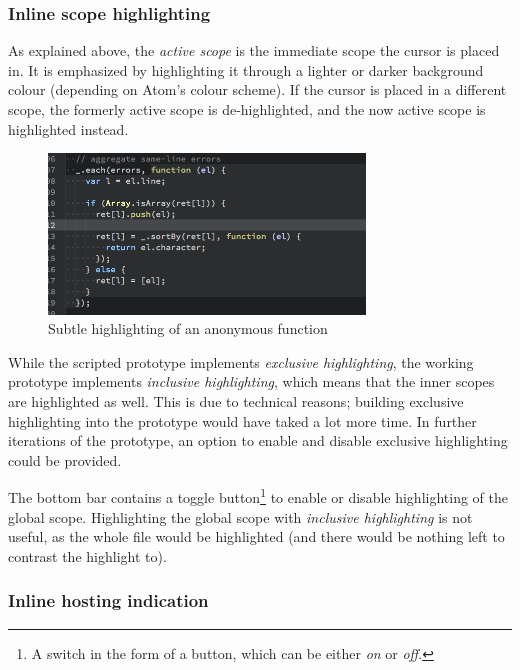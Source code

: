 \subsubsection{Inline scope
highlighting}\label{inline-scope-highlighting}

As explained above, the \emph{active scope} is the immediate scope the
cursor is placed in. It is emphasized by highlighting it through a
lighter or darker background colour (depending on Atom’s colour scheme).
If the cursor is placed in a different scope, the formerly active scope
is de-highlighted, and the now active scope is highlighted instead.

\begin{figure}[htbp]
\centering
\includegraphics[keepaspectratio,width=0.75\textwidth]{img/scope-highlight.png}
\caption{Subtle highlighting of an anonymous function}
\label{fig:protohighlighting}
\end{figure}

While the scripted prototype implements \emph{exclusive highlighting},
the working prototype implements \emph{inclusive highlighting}, which
means that the inner scopes are highlighted as well. This is due to
technical reasons; building exclusive highlighting into the prototype
would have taked a lot more time. In further iterations of the
prototype, an option to enable and disable exclusive highlighting could
be provided.

The bottom bar contains a toggle
button\footnote{A switch in the form of a button, which can be either \emph{on} or \emph{off}.}
to enable or disable highlighting of the global scope. Highlighting the
global scope with \emph{inclusive highlighting} is not useful, as the
whole file would be highlighted (and there would be nothing left to
contrast the highlight to).

\subsubsection{Inline hosting
indication}\label{inline-hosting-indication}


